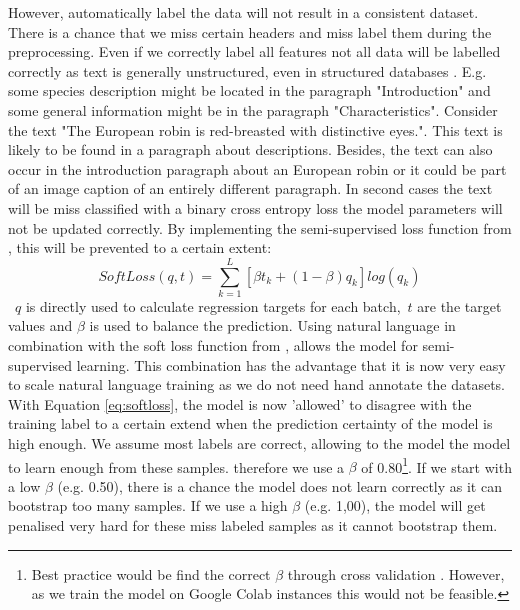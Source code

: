 \documentclass[a4paper, 12pt, oneside]{book} %
\begin{document}
However, automatically label the data will not result in a consistent dataset.
There is a chance that we miss certain headers and miss label them during the preprocessing.
Even if we correctly label all features not all data will be labelled correctly as text is generally unstructured, even in structured databases \autocite{kumar_text_2020}.
E.g. some species description might be located in the paragraph "Introduction" and some general information might be in the paragraph "Characteristics".
Consider the text "The European robin is red-breasted with distinctive eyes.".
This text is likely to be found in a paragraph about descriptions.
Besides, the text can also occur in the introduction paragraph about an European robin or it could be part of an image caption of an entirely different paragraph. 
In second cases the text will be miss classified with a binary cross entropy loss the model parameters will not be updated correctly. 
By implementing the semi-supervised loss function from \textcite{reed_training_2015}, this will be prevented to a certain extent:
\begin{equation} \label{eq:softloss}
 SoftLoss(q, t) = \sum_{k=1}^{L}[\beta t _k + (1- \beta )q _k]log(q _k)
\end{equation}
~$q$ is directly used to calculate regression targets for each batch,~$t$ are the target values and \(\beta\) is used to balance the prediction.
Using natural language in combination with the soft loss function from \textcite{reed_training_2015}, allows the model for semi-supervised learning.
This combination has the advantage that it is now very easy to scale natural language training as we do not need hand annotate the datasets.
With Equation \ref{eq:softloss}, the model is now 'allowed' to disagree with the training label to a certain extend when the prediction certainty of the model is high enough.
We assume most labels are correct, allowing to the model the model to learn enough from these samples.
therefore we use a \(\beta\) of 0.80\footnote{Best practice would be find the correct \(\beta\) through cross validation \autocite{reed_training_2015, han_survey_2021}. However, as we train the model on Google Colab instances this would not be feasible.}.
If we start with a low \(\beta\) (e.g. 0.50), there is a chance the model does not learn correctly as it can bootstrap too many samples.
If we use a high \(\beta\) (e.g. 1,00), the model will get penalised very hard for these miss labeled samples as it cannot bootstrap them.
\end{document}
